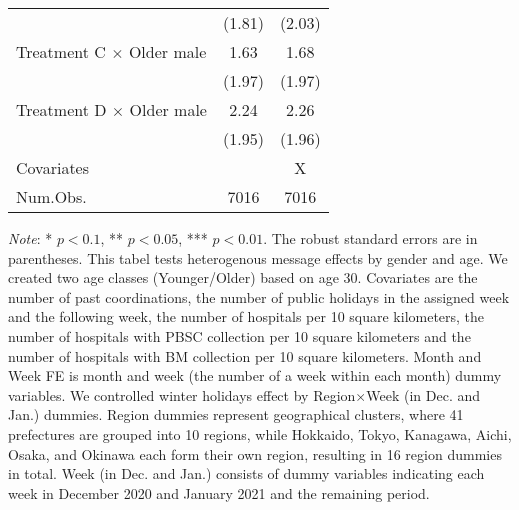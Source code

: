 \documentclass[12pt, a4paper]{article}
\begin{document}
\begin{table}[H]
\begin{threeparttable}
\begin{tabular}[t]{lcc}
 & (\num{1.81}) & (\num{2.03})\\
Treatment C $\times$ Older male & \num{1.63} & \num{1.68}\\
 & (\num{1.97}) & (\num{1.97})\\
Treatment D $\times$ Older male & \num{2.24} & \num{2.26}\\
 & (\num{1.95}) & (\num{1.96})\\
\midrule
Covariates &  & X\\
Num.Obs. & \num{7016} & \num{7016}\\
\bottomrule
\end{tabular}
\begin{tablenotes}
\item \emph{Note}: * $p < 0.1$, ** $p < 0.05$, *** $p < 0.01$. The robust standard errors are in parentheses. This tabel tests heterogenous message effects by gender and age. We created two age classes (Younger/Older) based on age 30. Covariates are the number of past coordinations, the number of public holidays in the assigned week and the following week, the number of hospitals per 10 square kilometers, the number of hospitals with PBSC collection per 10 square kilometers and the number of hospitals with BM collection per 10 square kilometers. Month and Week FE is month and week (the number of a week within each month) dummy variables. We controlled winter holidays effect by Region$\times$Week (in Dec. and Jan.) dummies. Region dummies represent geographical clusters, where 41 prefectures are grouped into 10 regions, while Hokkaido, Tokyo, Kanagawa, Aichi, Osaka, and Okinawa each form their own region, resulting in 16 region dummies in total. Week (in Dec. and Jan.) consists of dummy variables indicating each week in December 2020 and January 2021 and the remaining period.
\end{tablenotes}
\end{threeparttable}
\end{table}
\end{document}
